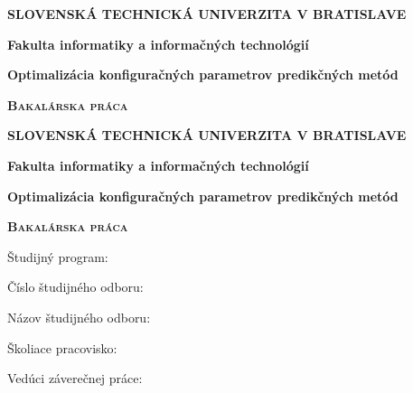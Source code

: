 \documentclass[12pt,oneside,slovak,a4paper]{book}
\begin{document}
\begin{titlepage}
	\centering
	{\large \textbf{SLOVENSKÁ TECHNICKÁ UNIVERZITA V BRATISLAVE} \par}
	\vspace{0.5cm}
	{\large \textbf{Fakulta informatiky a informačných technológií} \par}
	\vspace{6cm}
	{\huge\bfseries Optimalizácia konfiguračných parametrov predikčných metód \par}
	\vspace{2cm}
	{\scshape\large \textbf{Bakalárska práca} \par}
	\vspace{12.5cm}
	\vfill
\end{titlepage}

\begin{titlepage}
	\centering
	{\large \textbf{SLOVENSKÁ TECHNICKÁ UNIVERZITA V BRATISLAVE} \par}
	\vspace{0.5cm}
	{\large \textbf{Fakulta informatiky a informačných technológií} \par}
	\vspace{6cm}
	{\huge\bfseries Optimalizácia konfiguračných parametrov predikčných metód \par}
	\vspace{2cm}
	{\scshape\large \textbf{Bakalárska práca} \par}
	\vspace{5.5cm}
	\raggedright
	{\normalsize Študijný program: \par}
	{\normalsize Číslo študijného odboru: \par}
	{\normalsize Názov študijného odboru: \par}
	{\normalsize Školiace pracovisko: \par}
	{\normalsize Vedúci záverečnej práce: \par}
	\vspace{4.5cm}
\end{titlepage}


\tableofcontents

\end{document}
